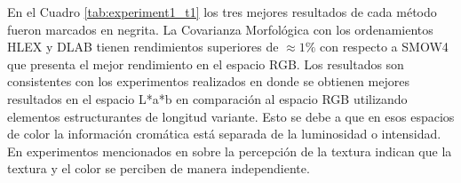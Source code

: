 \begin{table}
\begin{tabular}{@{}lrr@{}}
\end{tabular}
\label{exper_ordenaciones}
\end{table}
En el Cuadro \ref{tab:experiment1_t1} los tres mejores resultados de cada método fueron marcados en negrita. La Covarianza Morfológica con los ordenamientos HLEX y DLAB tienen rendimientos superiores de $\approx 1\%$ con respecto a SMOW4 que presenta el mejor rendimiento en el espacio RGB. Los resultados son consistentes con los experimentos realizados en \cite{hanbury2005illumination} donde se obtienen mejores resultados en el espacio L*a*b en comparación al espacio RGB utilizando elementos estructurantes de longitud variante. Esto se debe a que en esos espacios de color la información cromática está separada de la luminosidad o intensidad. En experimentos mencionados en \cite{bianconi2011theoretical} sobre la percepción de la textura indican que la textura y el color se perciben de manera independiente. 

